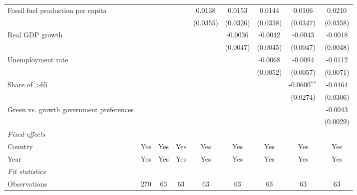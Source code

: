 \begin{table}[htbp]
\begin{tabular}{lcccccccc}
      Fossil fuel production per capita                         &          &          &          & 0.0138   & 0.0153   & 0.0144   & 0.0106         & 0.0210\\   
                                                                &          &          &          & (0.0355) & (0.0326) & (0.0338) & (0.0347)       & (0.0358)\\   
      Real GDP growth                                           &          &          &          &          & -0.0036  & -0.0042  & -0.0043        & -0.0018\\   
                                                                &          &          &          &          & (0.0047) & (0.0045) & (0.0047)       & (0.0048)\\   
      Unemployment rate                                         &          &          &          &          &          & -0.0068  & -0.0094        & -0.0112\\   
                                                                &          &          &          &          &          & (0.0052) & (0.0057)       & (0.0071)\\   
      Share of >65                                              &          &          &          &          &          &          & -0.0600$^{**}$ & -0.0464\\   
                                                                &          &          &          &          &          &          & (0.0274)       & (0.0306)\\   
      Green vs. growth government preferences                   &          &          &          &          &          &          &                & -0.0043\\   
                                                                &          &          &          &          &          &          &                & (0.0029)\\   
      \midrule
      \emph{Fixed-effects}\\
      Country                                                   & Yes      & Yes      & Yes      & Yes      & Yes      & Yes      & Yes            & Yes\\  
      Year                                                      & Yes      & Yes      & Yes      & Yes      & Yes      & Yes      & Yes            & Yes\\  
      \midrule
      \emph{Fit statistics}\\
      Observations                                              & 270      & 63       & 63       & 63       & 63       & 63       & 63             & 63\\  

\end{tabular}
\end{table}
